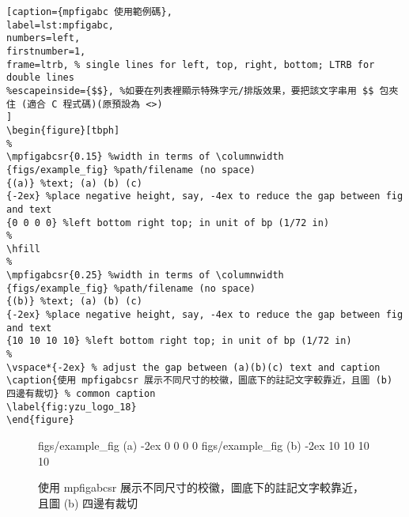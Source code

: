 \begin{enumerate}
{\centering\begin{lstlisting}[caption={mpfigabc 使用範例碼},
label=lst:mpfigabc,
numbers=left,
firstnumber=1,
frame=ltrb, % single lines for left, top, right, bottom; LTRB for double lines 
%escapeinside={$$}, %如要在列表裡顯示特殊字元/排版效果，要把該文字串用 $$ 包夾住 (適合 C 程式碼)(原預設為 <>)
]
\begin{figure}[tbph]
%
\mpfigabcsr{0.15} %width in terms of \columnwidth
{figs/example_fig} %path/filename (no space)
{(a)} %text; (a) (b) (c)
{-2ex} %place negative height, say, -4ex to reduce the gap between fig and text
{0 0 0 0} %left bottom right top; in unit of bp (1/72 in)
%
\hfill
%
\mpfigabcsr{0.25} %width in terms of \columnwidth
{figs/example_fig} %path/filename (no space)
{(b)} %text; (a) (b) (c)
{-2ex} %place negative height, say, -4ex to reduce the gap between fig and text
{10 10 10 10} %left bottom right top; in unit of bp (1/72 in)
%
\vspace*{-2ex} % adjust the gap between (a)(b)(c) text and caption
\caption{使用 mpfigabcsr 展示不同尺寸的校徽，圖底下的註記文字較靠近，且圖 (b) 四邊有裁切} % common caption
\label{fig:yzu_logo_18}
\end{figure}
\end{lstlisting}\par}

%
\begin{figure}[tbph]
%
{figs/example_fig} %
{(a)} %
{-2ex} %
{0 0 0 0} %
%
\hfill
%
{figs/example_fig} %
{(b)} %
{-2ex} %
{10 10 10 10} %
%
\vspace*{-2ex} %
\caption{使用 mpfigabcsr 展示不同尺寸的校徽，圖底下的註記文字較靠近，且圖 (b) 四邊有裁切} %
\label{fig:yzu_logo_18}
\end{figure}


\end{enumerate}
\clearpage
